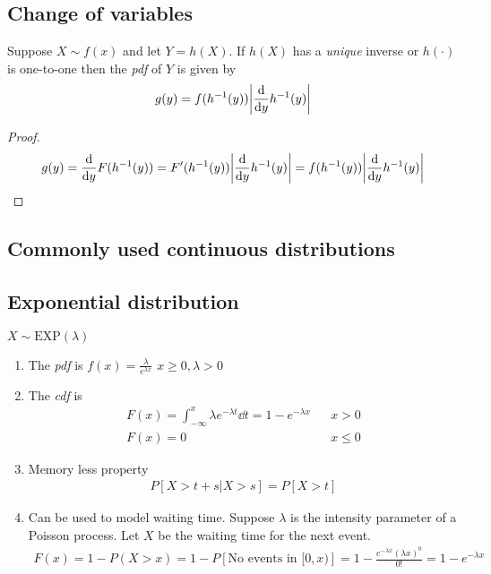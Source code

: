 \documentclass[16pt,a4paper]{article}
\begin{document}
\subsection{Change of variables}
Suppose $X\sim f(x)$ and let $Y = h(X)$. If $h(X)$ has a \textit{unique} inverse or $h(\cdot)$ is one-to-one then the \textit{pdf} of $Y$ is given by 
\begin{align*}
    g(y) = f(h^{-1}(y)) \abs{\dv{}{y}h^{-1}(y)}
\end{align*}
\begin{proof}
    \begin{align*}
        g(y) = \dv{}{y}F(h^{-1}(y)) = F'(h^{-1}(y))\abs{\dv{}{y}h^{-1}(y)} = f(h^{-1}(y))\abs{\dv{}{y}h^{-1}(y)}
    \end{align*}
\end{proof}
\newpage
\subsection{Commonly used continuous distributions}
\subsection{Exponential distribution}
$X\sim \text{EXP}(\lambda)$ 
\begin{enumerate}[(1)]
    \item The \textit{pdf} is $f(x) = \frac{\lambda}{e^{\lambda x}}$ $x\geq 0, \lambda > 0$
    \item The \textit{cdf} is 
        \begin{align*}
            F(x) = \int_{-\infty}^x \lambda e^{-\lambda t} \dd t = 1 - e^{-\lambda x} && x > 0\\
            F(x) = 0 && x \leq  0
        \end{align*}
    \item Memory less property 
        \begin{align*}
            P[X > t+s | X > s] = P[X>t]
        \end{align*}
    \item Can be used to model waiting time. Suppose $\lambda$ is the intensity parameter of a Poisson process. Let $X$ be the waiting time for the next event. 
        \begin{align*}
            F(x) = 1 - P(X>x) = 1-P[\text{No events in $[0, x)$}] = 1-\frac{e^{-\lambda x}(\lambda x)^0}{0!} = 1-e^{-\lambda x}
        \end{align*}
\end{enumerate}
\end{document}
